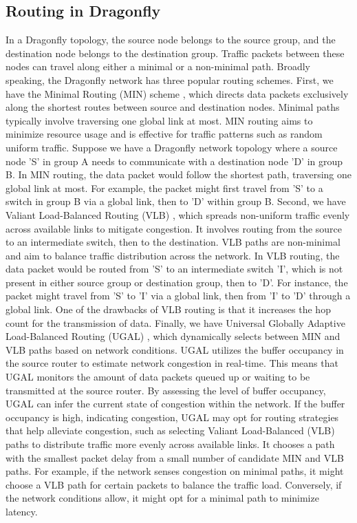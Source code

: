 \subsection{Routing in Dragonfly}
In a Dragonfly topology, the source node belongs to the source group, and the destination node belongs to the destination group. Traffic packets between these nodes can travel along either a minimal or a non-minimal path. Broadly speaking, the Dragonfly network has three popular routing schemes.
First, we have the Minimal Routing (MIN) scheme \cite{kim2008technology}, which directs data packets exclusively along the shortest routes between source and destination nodes. Minimal paths typically involve traversing one global link at most. MIN routing aims to minimize resource usage and is effective for traffic patterns such as random uniform traffic. Suppose we have a Dragonfly network topology where a source node 'S' in group A needs to communicate with a destination node 'D' in group B. In MIN routing, the data packet would follow the shortest path, traversing one global link at most. For example, the packet might first travel from 'S' to a switch in group B via a global link, then to 'D' within group B.
Second, we have Valiant Load-Balanced Routing (VLB) \cite{kim2008technology, kaplan2017unveiling}, which spreads non-uniform traffic evenly across available links to mitigate congestion. It involves routing from the source to an intermediate switch, then to the destination. VLB paths are non-minimal and aim to balance traffic distribution across the network. In VLB routing, the data packet would be routed from 'S' to an intermediate switch 'I', which is not present in either source group or destination group, then to 'D'. For instance, the packet might travel from 'S' to 'I' via a global link, then from 'I' to 'D' through a global link. One of the drawbacks of VLB routing is that it increases the hop count for the transmission of data.
Finally, we have Universal Globally Adaptive Load-Balanced Routing (UGAL) \cite{kim2008technology, kaplan2017unveiling}, which dynamically selects between MIN and VLB paths based on network conditions. UGAL utilizes the buffer occupancy in the source router to estimate network congestion in real-time. This means that UGAL monitors the amount of data packets queued up or waiting to be transmitted at the source router. By assessing the level of buffer occupancy, UGAL can infer the current state of congestion within the network. If the buffer occupancy is high, indicating congestion, UGAL may opt for routing strategies that help alleviate congestion, such as selecting Valiant Load-Balanced (VLB) paths to distribute traffic more evenly across available links. It chooses a path with the smallest packet delay from a small number of candidate MIN and VLB paths. For example, if the network senses congestion on minimal paths, it might choose a VLB path for certain packets to balance the traffic load. Conversely, if the network conditions allow, it might opt for a minimal path to minimize latency.




